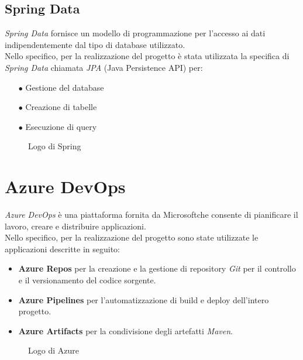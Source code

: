 \subsection{Spring Data}\label{sec:springdata}
\emph{Spring Data} fornisce un modello di programmazione per l’accesso ai dati indipendentemente dal tipo di database utilizzato.\\
Nello specifico, per la realizzazione del progetto è stata utilizzata la specifica di \emph{Spring Data} chiamata \emph{JPA} (Java Persistence API) per:
\begin{itemize}
	\item[$\bullet$]Gestione del database
	\item[$\bullet$]Creazione di tabelle
	\item[$\bullet$]Esecuzione di query
\end{itemize}

\begin{figure}[ht]
	\centering
	\caption{Logo di Spring}
	\label{fig:one}
\end{figure}


\section{Azure DevOps}\label{sec:azure}
\emph{Azure DevOps} è una piattaforma fornita da Microsoft\texttrademark che consente di pianificare il lavoro, creare e distribuire applicazioni.\\
Nello specifico, per la realizzazione del progetto sono state utilizzate le applicazioni descritte in seguito:
\begin{itemize}
	\item \textbf{Azure Repos} per la creazione e la gestione di repository \emph{Git} per il controllo e il versionamento del codice sorgente.
	\item \textbf{Azure Pipelines} per l’automatizzazione di build e deploy dell’intero progetto.
	\item \textbf{Azure Artifacts} per la condivisione degli artefatti \emph{Maven}.
\end{itemize}
\begin{figure}[ht]
	\centering
	\caption{Logo di Azure}
	\label{fig:one}
\end{figure}

